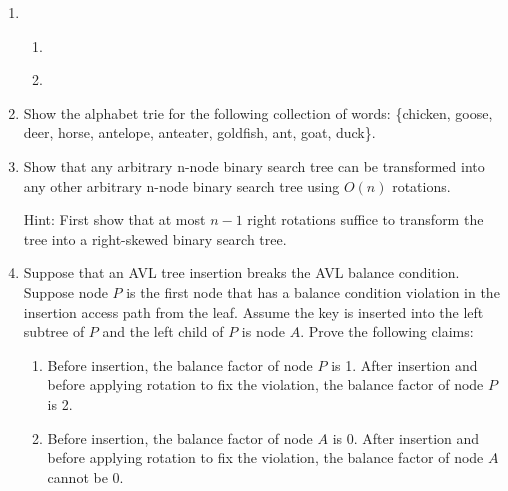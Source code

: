 \documentclass[12pt,a4paper]{article}
\makeatletter
\newtheorem*{solution}{Solution}
\theoremstyle{definition}
\renewenvironment{solution}[1][Solution] {\par\pushQED{\qed}\normalfont\topsep6\p@\@plus6\p@\relax\trivlist\item[\hskip\labelsep\bfseries#1\@addpunct{.}]\ignorespaces}{\popQED\endtrivlist\@endpefalse} \makeatother
\makeatother
\begin{document}
\begin{enumerate}
\begin{solution}
\begin{enumerate}
    \item
\begin{figure}[h]
\centering
{}
\end{figure}

    \item

\end{enumerate}
\end{solution}

\item  Show the alphabet trie for the following collection of words: \{chicken, goose, deer, horse, antelope, anteater, goldfish, ant, goat, duck\}.


\item  Show that any arbitrary n-node binary search tree can be transformed into any other arbitrary n-node binary search tree using $O(n)$ rotations. 

	{\color{blue} Hint: First show that at most $n − 1$ right rotations suffice to transform the tree into a right-skewed binary
search tree.}


\item  Suppose that an AVL tree insertion breaks the AVL balance condition. Suppose node $P$ is the ﬁrst node that has a balance condition violation in the insertion access path from the leaf. Assume the key is inserted into the left subtree of $P$ and the left child of $P$ is node $A$. Prove the following claims:
	\begin{enumerate}
		\item  Before insertion, the balance factor of node $P$ is 1. After insertion and before applying rotation to ﬁx the violation, the balance factor of node $P$ is 2.
		\item Before insertion, the balance factor of node $A$ is 0. After insertion and before applying rotation to ﬁx the violation, the balance factor of node $A$ cannot be 0.
	\end{enumerate}
	

\end{enumerate}

\end{document}
